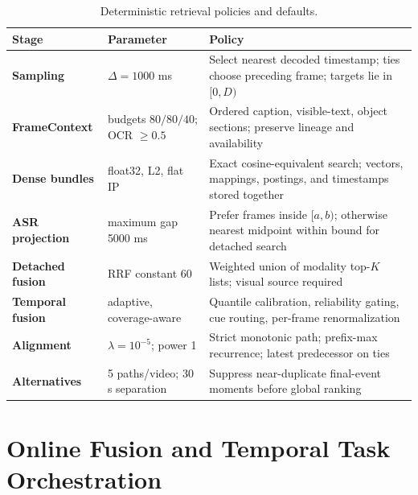 \begin{table}[H]
\centering
\caption{Deterministic retrieval policies and defaults.}
\label{tab:parameters}
\small
\begin{tabularx}{\textwidth}{@{}>{\bfseries}p{}p{}X@{}}
\toprule
Stage & Parameter & Policy \\
\midrule
Sampling & $\Delta=1000$ ms & Select nearest decoded timestamp; ties choose preceding frame; targets lie in $[0,D)$ \\
FrameContext & budgets $80/80/40$; OCR $\geq0.5$ & Ordered caption, visible-text, object sections; preserve lineage and availability \\
Dense bundles & float32, L2, flat IP & Exact cosine-equivalent search; vectors, mappings, postings, and timestamps stored together \\
ASR projection & maximum gap 5000 ms & Prefer frames inside $[a,b)$; otherwise nearest midpoint within bound for detached search \\
Detached fusion & RRF constant 60 & Weighted union of modality top-$K$ lists; visual source required \\
Temporal fusion & adaptive, coverage-aware & Quantile calibration, reliability gating, cue routing, per-frame renormalization \\
Alignment & $\lambda=10^{-5}$; power 1 & Strict monotonic path; prefix-max recurrence; latest predecessor on ties \\
Alternatives & 5 paths/video; 30 s separation & Suppress near-duplicate final-event moments before global ranking \\
\bottomrule
\end{tabularx}
\end{table}

\clearpage
\section{Online Fusion and Temporal Task Orchestration}

